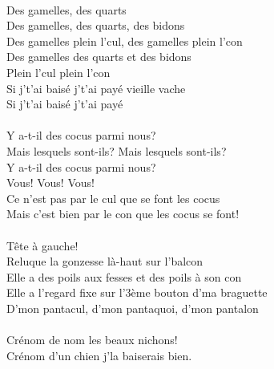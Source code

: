 \\Des gamelles, des quarts
\\Des gamelles, des quarts, des bidons
\\Des gamelles plein l'cul, des gamelles plein l'con
\\Des gamelles des quarts et des bidons
\\Plein l'cul plein l'con
\\Si j't'ai baisé j't'ai payé vieille vache
\\Si j't'ai baisé j't'ai payé
\\\\Y a-t-il des cocus parmi nous?
\\Mais lesquels sont-ils? Mais lesquels sont-ils?
\\Y a-t-il des cocus parmi nous?
\\Vous! Vous! Vous!
\\Ce n'est pas par le cul que se font les cocus
\\Mais c'est bien par le con que les cocus se font!
\\\\Tête à gauche!
\\Reluque la gonzesse là-haut sur l'balcon
\\Elle a des poils aux fesses et des poils à son con
\\Elle a l'regard fixe sur l'3ème bouton d'ma braguette
\\D'mon pantacul, d'mon pantaquoi, d'mon pantalon
\\\\Crénom de nom les beaux nichons!
\\Crénom d'un chien j'la baiserais bien.

\breakpage
